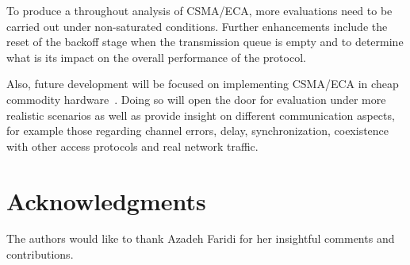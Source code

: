 

To produce a throughout analysis of CSMA/ECA, more evaluations need to be carried out under non-saturated conditions. Further enhancements include the reset of the backoff stage when the transmission queue is empty and to determine what is its impact on the overall performance of the protocol.


Also, future development will be focused on implementing CSMA/ECA in cheap commodity hardware~\cite{WMP}. Doing so will open the door for evaluation under more realistic scenarios as well as provide insight on different communication aspects, for example those regarding channel errors, delay, synchronization, coexistence with other access protocols and real network traffic. 


\section*{Acknowledgments}
The authors would like to thank Azadeh Faridi for her insightful comments and contributions.